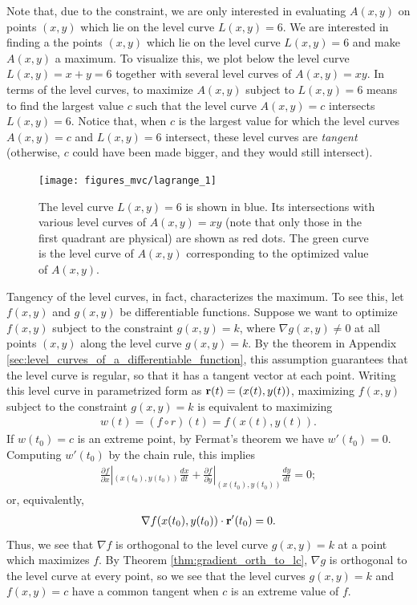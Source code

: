 \documentclass[12pt,letterpaper,reqno]{article}
\numberwithin{equation}{section}
\newcommand{\bbr}{{\bf r}}
\begin{document}
{Note that, due to the constraint, we are only interested in evaluating $A(x,y)$ on points $(x,y)$ which lie on the level curve $L(x,y)=6$. We are interested in finding a the points $(x,y)$ which lie on the level curve $L(x,y)=6$ and make $A(x,y)$ a maximum. To visualize this, we plot below the level curve $L(x,y)=x+y=6$ together with several level curves of $A(x,y)=xy$. In terms of the level curves, to maximize $A(x,y)$ subject to $L(x,y)=6$ means to find the largest value $c$ such that the level curve $A(x,y)=c$ intersects $L(x,y)=6$. Notice that, when $c$ is the largest value for which the level curves $A(x,y)=c$ and $L(x,y)=6$ intersect, these level curves are \emph{tangent} (otherwise, $c$ could have been made bigger, and they would still intersect). 

\begin{figure}[h]
	\centering
	\texttt{[image: figures\_mvc/lagrange\_1]}
	\caption{The level curve $L(x,y)=6$ is shown in blue. Its intersections with various level curves of $A(x,y)=xy$ (note that only those in the first quadrant are physical) are shown as red dots. The green curve is the level curve of $A(x,y)$ corresponding to the optimized value of $A(x,y)$.}
\end{figure}	
Tangency of the level curves, in fact, characterizes the maximum. To see this, let $f(x,y)$ and $g(x,y)$ be differentiable functions. Suppose we want to optimize $f(x,y)$ subject to the constraint $g(x,y)=k$, where $\nabla g(x,y) \neq 0$ at all points $(x,y)$ along the level curve $g(x,y)=k$. By the theorem in Appendix \ref{sec:level_curves_of_a_differentiable_function}, this assumption guarantees that the level curve is regular, so that it has a tangent vector at each point. Writing this level curve in parametrized form as $\bbr(t)=(x(t),y(t))$, maximizing $f(x,y)$ subject to the constraint $g(x,y)=k$ is equivalent to maximizing 
\begin{align*}
	w(t)=(f \circ r)(t)=f(x(t),y(t)).
\end{align*}
If $w(t_0)=c$ is an extreme point, by Fermat's theorem we have $w'(t_0)=0$. Computing $w'(t_0)$ by the chain rule, this implies
\begin{align*}
	\frac{\partial f}{\partial x}|_{(x(t_0),y(t_0))}\frac{dx}{dt}+\frac{\partial f}{\partial y}|_{(x(t_0),y(t_0))}\frac{dy}{dt}=0;
\end{align*}
or, equivalently,
\begin{align*}
	\nabla f(x(t_0),y(t_0)) \cdot \bbr'(t_0)=0.
\end{align*}
Thus, we see that $\nabla f$ is orthogonal to the level curve $g(x,y)=k$ at a point which maximizes $f$. By Theorem \ref{thm:gradient_orth_to_lc}, $\nabla g$ is orthogonal to the level curve at every point, so we see that the level curves $g(x,y)=k$ and $f(x,y)=c$ have a common tangent when $c$ is an extreme value of $f$.

}
\end{document}
